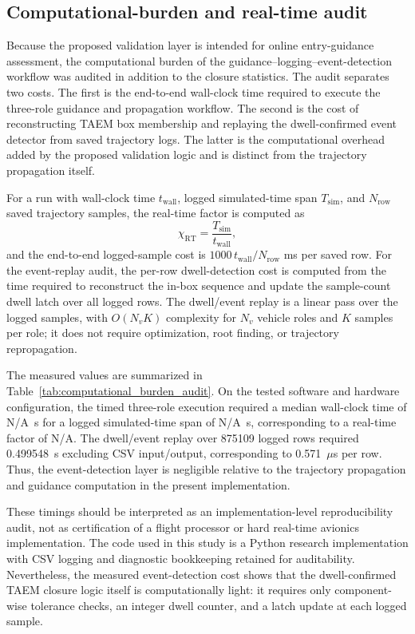 \subsection{Computational-burden and real-time audit}
\label{subsec:computational_burden_audit}

Because the proposed validation layer is intended for online entry-guidance assessment, the computational burden of the guidance--logging--event-detection workflow was audited in addition to the closure statistics. The audit separates two costs. The first is the end-to-end wall-clock time required to execute the three-role guidance and propagation workflow. The second is the cost of reconstructing TAEM box membership and replaying the dwell-confirmed event detector from saved trajectory logs. The latter is the computational overhead added by the proposed validation logic and is distinct from the trajectory propagation itself.

For a run with wall-clock time \(t_{\mathrm{wall}}\), logged simulated-time span \(T_{\mathrm{sim}}\), and \(N_{\mathrm{row}}\) saved trajectory samples, the real-time factor is computed as
\[
\chi_{\mathrm{RT}}=\frac{T_{\mathrm{sim}}}{t_{\mathrm{wall}}},
\]
and the end-to-end logged-sample cost is \(1000\,t_{\mathrm{wall}}/N_{\mathrm{row}}\) ms per saved row. For the event-replay audit, the per-row dwell-detection cost is computed from the time required to reconstruct the in-box sequence and update the sample-count dwell latch over all logged rows. The dwell/event replay is a linear pass over the logged samples, with \(O(N_vK)\) complexity for \(N_v\) vehicle roles and \(K\) samples per role; it does not require optimization, root finding, or trajectory repropagation.

The measured values are summarized in Table~\ref{tab:computational_burden_audit}. On the tested software and hardware configuration, the timed three-role execution required a median wall-clock time of N/A~s for a logged simulated-time span of N/A~s, corresponding to a real-time factor of N/A. The dwell/event replay over 875109 logged rows required 0.499548~s excluding CSV input/output, corresponding to 0.571~\(\mu\)s per row. Thus, the event-detection layer is negligible relative to the trajectory propagation and guidance computation in the present implementation.

These timings should be interpreted as an implementation-level reproducibility audit, not as certification of a flight processor or hard real-time avionics implementation. The code used in this study is a Python research implementation with CSV logging and diagnostic bookkeeping retained for auditability. Nevertheless, the measured event-detection cost shows that the dwell-confirmed TAEM closure logic itself is computationally light: it requires only component-wise tolerance checks, an integer dwell counter, and a latch update at each logged sample.
